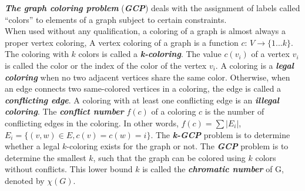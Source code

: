 \documentclass[12pt,a4paper,twoside]{scrartcl}
\numberwithin{equation}{section}
\begin{document}
\emph{\textbf{The graph coloring problem}} (\emph{\textbf{GCP}})\label{Graph coloring problem}
 deals with the assignment of labels called ``colors'' to elements of a graph subject to certain constraints.\\
When used without any qualification, a coloring of a graph is almost always a proper vertex coloring, 
A vertex coloring of a graph is a function $c$: $V\rightarrow \{1...k\}$. The coloring with $k$ colors is called a \emph{\textbf{k-coloring}}. The value $c(v_i)$ of a vertex $v_i$ is called the color or the index of the color of the vertex $v_i$. A coloring is a \emph{\textbf{legal coloring}} when no two adjacent vertices share the same color. Otherwise, when an edge connects two same-colored vertices in a coloring, the edge is called a \emph{\textbf{conflicting edge}}. A coloring with at least one conflicting edge is an \emph{\textbf{illegal coloring}}. The \emph{\textbf{conflict number}} $f(c)$ of a coloring $c$ is the number of conflicting edges in the coloring. In other words, $f(c)=\sum |E_i|$, $E_i = \{(v,w)\in E,c(v)= c(w)= i\}$.
The \emph{\textbf{k-GCP}} problem is to determine whether a legal $k$-coloring exists for the graph or not. The \emph{\textbf{GCP}} problem is to determine the smallest $k$, such that the graph can be colored using $k$ colors without conflicts. This lower bound $k$ is called the \emph{\textbf{chromatic number}} of G, denoted by $\chi(G)$.
\end{document}
